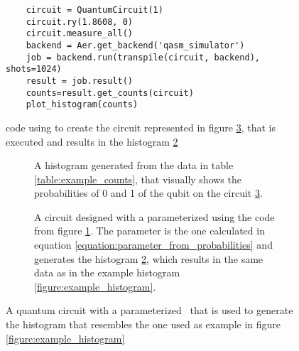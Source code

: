 \begin{figure}[!h]
    \centering
    \begin{verbatim}
    circuit = QuantumCircuit(1)
    circuit.ry(1.8608, 0)
    circuit.measure_all()
    backend = Aer.get_backend('qasm_simulator')
    job = backend.run(transpile(circuit, backend), shots=1024)
    result = job.result()
    counts=result.get_counts(circuit)
    plot_histogram(counts)
    \end{verbatim}
    \caption{ code using  to create the circuit represented in figure \ref{figure:circuit_for_histogram}, that is executed and results in the histogram \ref{figure:circuit_histogram}}
    \label{figure:code_circuit_histogram_for_example_data}
\end{figure}

\begin{figure}[!h]
    \begin{subfigure}{.5\textwidth}
        \centering
        \scalebox{\histogramwidth}{
            
        }
        \caption{A histogram generated from the data in table \ref{table:example_counts}, that visually shows the probabilities of 0 and 1 of the qubit on the circuit \ref{figure:circuit_for_histogram}.}
        \label{figure:circuit_histogram}
    \end{subfigure}
    \begin{subfigure}{.5\textwidth}
        \centering
        \caption{A circuit designed with a parameterized \rygate using the code from figure \ref{figure:code_circuit_histogram_for_example_data}. The parameter is the one calculated in equation \ref{equation:parameter_from_probabilities} and generates the histogram \ref{figure:circuit_histogram}, which results in the same data as in the example histogram \ref{figure:example_histogram}.}
        \label{figure:circuit_for_histogram}
    \end{subfigure}
    \caption{A quantum circuit with a parameterized \rygate\ that is used to generate the histogram that resembles the one used as example in figure \ref{figure:example_histogram}}
    \label{figure:figure_circuit_histogram_rebuilt_from_example}
\end{figure}

